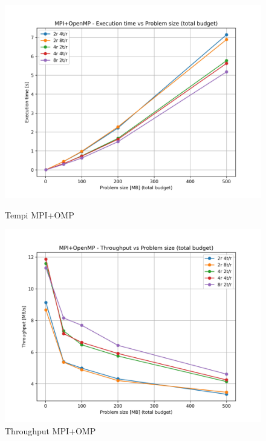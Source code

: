 			\begin{figure}[H]
				\centering
				\begin{minipage}[t]{0.49\textwidth}
					\centering
					\includegraphics[width=\textwidth]{img/mpi_omp_plots/mpi_omp_times.jpg}
					\caption{Tempi MPI+OMP}
					\label{fig:mpi_omp_times}
				\end{minipage}
				\hfill
				\begin{minipage}[t]{0.49\textwidth}
					\centering
					\includegraphics[width=\textwidth]{img/mpi_omp_plots/mpi_omp_throughput.jpg}
					\caption{Throughput MPI+OMP}
					\label{fig:mpi_omp_throughput}
				\end{minipage}
			\end{figure}
			
